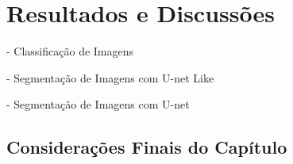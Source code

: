 \newpage
\clearpage

\section{Resultados e Discussões}
\label{result:result}

- Classificação de Imagens

- Segmentação de Imagens com U-net Like

- Segmentação de Imagens com U-net

\subsection{Considerações Finais do Capítulo}
\label{result:final}
